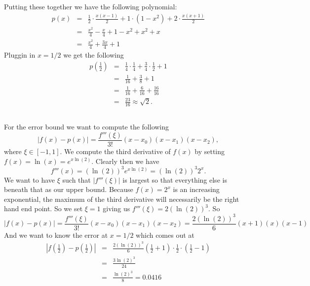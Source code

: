 \documentclass[12pt]{amsart}
\begin{document}
\begin{onehalfspace}
        \subsection{}
        Putting these together we have the following polynomial:
        \begin{eqnarray*}
            p(x) & = &  \frac{1}{2}\cdot\frac{x(x-1)}{2} + 1\cdot(1-x^2) + 2\cdot\frac{x(x+1)}{2} \\
             & = & \frac{x^2}{4} - \frac{x}{4} + 1 -x^2 + x^2 + x\\
            & = & \frac{x^2}{4} + \frac{3x}{4} + 1
        \end{eqnarray*}
        Pluggin in $x=1/2$ we get the following
        \begin{eqnarray*}
            p\left(\frac{1}{2}\right) & = & \frac{1}{4}\cdot\frac{1}{4} + \frac{3}{4}\cdot\frac{1}{2} + 1\\
            & = & \frac{1}{16} + \frac{3}{8} + 1\\
            & = & \frac{1}{16} + \frac{6}{16} + \frac{16}{16}\\
            & = & \frac{23}{16} \approx \sqrt{2}.
        \end{eqnarray*}

        \subsection{}
        For the error bound we want to compute the following
        \begin{displaymath}
            |f(x) - p(x)| = \frac{f'''(\xi)}{3!} (x - x_0)(x - x_1)(x - x_2),
        \end{displaymath}
        where $\xi\in[-1,1]$.
        We compute the third derivative of $f(x)$ by setting $f(x) = \ln(x) = e^{x\ln(2)}$.
        Clearly then we have
        \begin{displaymath}
            f'''(x) = (\ln(2))^3 e^{x\ln(2)} = (\ln(2))^3 2^x.
        \end{displaymath}
        We want to have $\xi$ such that $|f'''(\xi)|$ is largest so that everything else is beneath that
        as our upper bound.
        Because $f(x) = 2^x$ is an increasing exponential, the maximum of the third derivative will necessarily
        be the right hand end point. So we set $\xi=1$ giving us $f'''(\xi) = 2(\ln(2))^3.$ So
        \begin{displaymath}
            |f(x) - p(x)| = \frac{f'''(\xi)}{3!} (x - x_0)(x - x_1)(x - x_2) = \frac{2(\ln(2))^3}{6}(x+1)(x)(x-1)
        \end{displaymath}
        And we want to know the error at $x=1/2$ which comes out at
        \begin{eqnarray*}
            \left|f\left(\frac{1}{2}\right) - p\left(\frac{1}{2}\right)\right| & = & \frac{2(\ln(2))^3}{6}\left(\frac{1}{2}+1\right)\cdot\frac{1}{2}\cdot\left(\frac{1}{2}-1\right)\\
            & = & \frac{3\ln(2)^3}{24} \\
            & = & \frac{\ln(2)^3}{8} = 0.0416
        \end{eqnarray*}


\end{onehalfspace}
\end{document}

